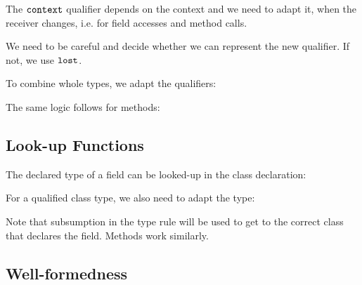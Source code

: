 The $ \texttt{\upshape{context}\,\!} $ qualifier depends on the context and we need to
adapt it, when the receiver changes, i.e. for field accesses and
method calls.

We need to be careful and decide whether we can represent the new
qualifier. If not, we use $ \texttt{\upshape{lost}\,\!} $.

\vspace{0.5ex}
\ottdefnqcombqrules{}
\vspace{2.0ex}


To combine whole types, we adapt the qualifiers:

\vspace{0.5ex}
\ottdefnqcombtrules{}
\vspace{2.0ex}


The same logic follows for methods:

\vspace{0.5ex}
\ottdefnqcombmsrules{}
\vspace{2.0ex}



\subsection{Look-up Functions}

The declared type of a field can be looked-up in the class
declaration:

\vspace{0.5ex}
\ottdefnsftypec{}
\vspace{2.0ex}


For a qualified class type, we also need to adapt the type:

\vspace{0.5ex}
\ottdefnsftypet{}
\vspace{2.0ex}


Note that subsumption in the type rule will be used to get to the
correct class that declares the field.
Methods work similarly.

\vspace{0.5ex}
\ottdefnsmsigc{}
\vspace{2.0ex}


\vspace{0.5ex}
\ottdefnsmsigt{}
\vspace{2.0ex}


\subsection{Well-formedness}

